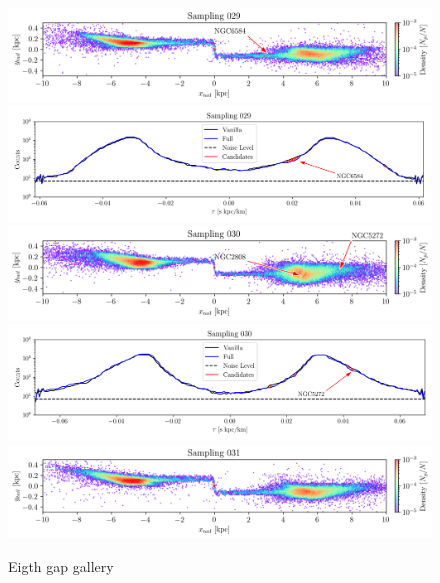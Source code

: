 \documentclass{aa}
\begin{document}
\begin{appendix}
    \begin{figure}
      \centering      
      \includegraphics[width=\linewidth]{gallery_of_gaps_monte-carlo-029.png}    
      \includegraphics[width=\linewidth]{tau-profile-monte-carlo-029.png}  
      \includegraphics[width=\linewidth]{gallery_of_gaps_monte-carlo-030.png}
      \includegraphics[width=\linewidth]{tau-profile-monte-carlo-030.png}
      \includegraphics[width=\linewidth]{gallery_of_gaps_monte-carlo-031.png}
      \caption{Eigth gap gallery}
      \label{fig:gallery7}
      \end{figure}        



\end{appendix}
\end{document}
